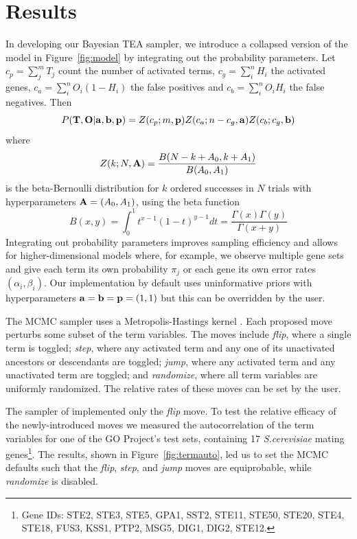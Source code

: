 \section*{Results}

In developing our Bayesian TEA sampler,
we introduce a collapsed version of the model in Figure~\ref{fig:model} by integrating out the probability parameters.
Let $c_p = \sum_j^m T_j$ count the number of activated terms,
$c_g = \sum_i^n H_i$ the activated genes,
$c_a = \sum_i^n O_i(1-H_i)$ the false positives and
$c_b = \sum_i^n O_i H_i$ the false negatives.
Then
\[
P({\bf T},{\bf O}|{\bf a},{\bf b},{\bf p}) =
Z(c_p;m,{\bf p})
Z(c_a;n-c_g,{\bf a})
Z(c_b;c_g,{\bf b})
\]
where
\[
Z(k;N,{\bf A}) =
\frac{B(N-k+A_0,k+A_1)}{B(A_0,A_1)}
\]
is the beta-Bernoulli distribution for $k$ ordered successes in $N$ trials with hyperparameters ${\bf A}=(A_0,A_1)$,
using the beta function
\[
B(x,y) = \int_0^1 t^{x-1} (1-t)^{y-1} dt = \frac{\Gamma(x)\Gamma(y)}{\Gamma(x+y)}
\]
Integrating out probability parameters improves sampling efficiency
and allows for higher-dimensional models where, for example, we observe multiple gene sets
and give each term its own probability $\pi_j$
or each gene its own error rates $(\alpha_i, \beta_i)$.
Our implementation by default uses uninformative priors with hyperparameters ${\bf a}={\bf b}={\bf p}=(1,1)$
but this can be overridden by the user.

The MCMC sampler uses a Metropolis-Hastings kernel \citep{GilksEtal96}.
Each proposed move perturbs some subset of the term variables.
The moves include {\em flip}, where a single term is toggled;
{\em step}, where any activated term and any one of its unactivated ancestors or descendants are toggled;
{\em jump}, where any activated term and any unactivated term are toggled; and
{\em randomize}, where all term variables are uniformly randomized.
The relative rates of these moves can be set by the user.

The sampler of \cite{pmid20172960} implemented only the {\em flip} move.
To test the relative efficacy of the newly-introduced moves we measured the autocorrelation of the term variables
for one of the GO Project's test sets, containing 17 {\em S.cerevisiae}
mating genes\footnote{Gene IDs: STE2, STE3, STE5, GPA1, SST2, STE11, STE50, STE20, STE4, STE18, FUS3, KSS1, PTP2, MSG5, DIG1, DIG2, STE12.}.
The results, shown in Figure~\ref{fig:termauto}, led us to set the MCMC defaults such that
the {\em flip}, {\em step}, and {\em jump} moves are equiprobable,
while {\em randomize} is disabled.

